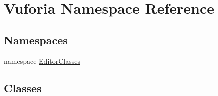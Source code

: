 \hypertarget{namespace_vuforia}{}\section{Vuforia Namespace Reference}
\label{namespace_vuforia}
\subsection*{Namespaces}
\begin{DoxyCompactItemize}
\item 
namespace \hyperlink{namespace_vuforia_1_1_editor_classes}{Editor\+Classes}
\end{DoxyCompactItemize}
\subsection*{Classes}
